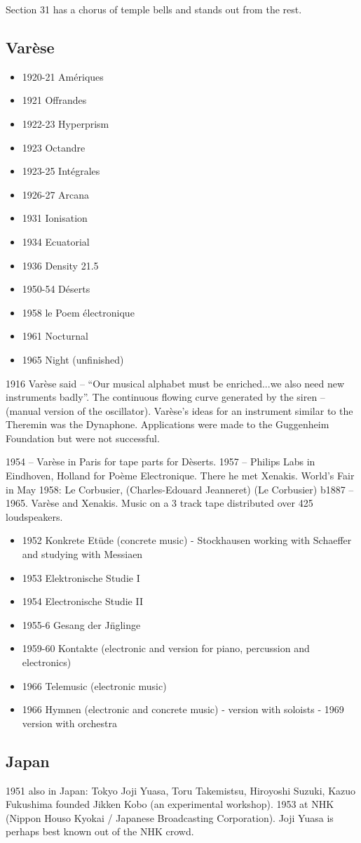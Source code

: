 Section 31 has a chorus of temple bells and stands out from the rest.


\subsection{Var\`ese}
\begin{itemize}
\item 1920-21		Am\'eriques
\item 1921		Offrandes
\item 1922-23		Hyperprism
\item 1923		Octandre
\item 1923-25		Int\'egrales
\item 1926-27		Arcana
\item 1931		Ionisation
\item 1934		Ecuatorial
\item 1936		Density 21.5
\item 1950-54		D\'eserts
\item 1958		le Poem \'electronique
\item 1961		Nocturnal
\item 1965		Night (unfinished)
\end{itemize}

1916 Varèse said – ``Our musical alphabet must be enriched...we also need new instruments badly''.  The continuous flowing curve generated by the siren – (manual version of the oscillator). Var\`ese's ideas for an instrument similar to the Theremin was the Dynaphone.  Applications were made to the Guggenheim Foundation but were not successful. 

1954 – Var\`ese in Paris for tape parts for D\`eserts. 1957 – Philips Labs in Eindhoven, Holland for Poème Electronique.  There he met Xenakis. World's Fair in May 1958: Le Corbusier, (Charles-Edouard Jeanneret) (Le Corbusier) b1887 – 1965. Var\`ese and Xenakis. Music on a 3 track tape distributed over 425 loudspeakers.

\begin{itemize}
\item 1952 Konkrete Et\"ude (concrete music) - Stockhausen working with Schaeffer and studying with Messiaen
\item 1953 Elektronische Studie I
\item 1954 Electronische Studie II
\item 1955-6 Gesang der J\"nglinge
\item 1959-60 Kontakte (electronic and version for piano, percussion and electronics)
\item 1966 Telemusic (electronic music)
\item 1966 Hymnen (electronic and concrete music) - version with soloists - 1969 version with orchestra
\end{itemize}

\subsection{Japan}
1951 also in Japan: Tokyo
Joji Yuasa, Toru Takemistsu, Hiroyoshi Suzuki, Kazuo Fukushima founded Jikken Kobo (an experimental workshop). 1953 at NHK (Nippon Houso Kyokai / Japanese Broadcasting Corporation).  Joji Yuasa is perhaps best known out of the NHK crowd.

